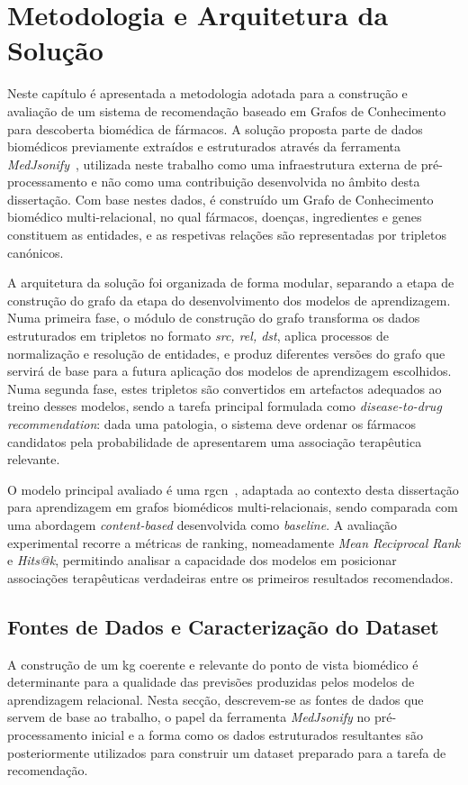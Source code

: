 % 
%  
%
\chapter{Metodologia e Arquitetura da Solução}
\label{cha:metodologia-arquitetura}
Neste capítulo é apresentada a metodologia adotada para a construção e avaliação de um sistema de recomendação baseado em Grafos de Conhecimento para descoberta biomédica de fármacos. A solução proposta parte de dados biomédicos previamente extraídos e estruturados através da ferramenta \emph{MedJsonify}~\cite{pereira2025mapping}, utilizada neste trabalho como uma infraestrutura externa de pré-processamento e não como uma contribuição desenvolvida no âmbito desta dissertação. Com base nestes dados, é construído um Grafo de Conhecimento biomédico multi-relacional, no qual fármacos, doenças, ingredientes e genes constituem as entidades, e as respetivas relações são representadas por tripletos canónicos.

A arquitetura da solução foi organizada de forma modular, separando a etapa de construção do grafo da etapa do desenvolvimento dos modelos de aprendizagem. Numa primeira fase, o módulo de construção do grafo transforma os dados estruturados em tripletos no formato \emph{src, rel, dst}, aplica processos de normalização e resolução de entidades, e produz diferentes versões do grafo que servirá de base para a futura aplicação dos modelos de aprendizagem escolhidos. Numa segunda fase, estes tripletos são convertidos em artefactos adequados ao treino desses modelos, sendo a tarefa principal formulada como \emph{disease-to-drug recommendation}: dada uma patologia, o sistema deve ordenar os fármacos candidatos pela probabilidade de apresentarem uma associação terapêutica relevante.

O modelo principal avaliado é uma \acrshort{rgcn}~\cite{schlichtkrull2018modeling}, adaptada ao contexto desta dissertação para aprendizagem em grafos biomédicos multi-relacionais, sendo comparada com uma abordagem \emph{content-based} desenvolvida como \emph{baseline}. A avaliação experimental recorre a métricas de ranking, nomeadamente \emph{Mean Reciprocal Rank} e \emph{Hits@k}, permitindo analisar a capacidade dos modelos em posicionar associações terapêuticas verdadeiras entre os primeiros resultados recomendados.

\section{Fontes de Dados e Caracterização do Dataset}
\label{sec:aquisicao-caracterizacao}
A construção de um \acrshort{kg} coerente e relevante do ponto de vista biomédico é determinante para a qualidade das previsões produzidas pelos modelos de aprendizagem relacional. Nesta secção, descrevem-se as fontes de dados que servem de base ao trabalho, o papel da ferramenta \emph{MedJsonify} no pré-processamento inicial e a forma como os dados estruturados resultantes são posteriormente utilizados para construir um dataset preparado para a tarefa de recomendação.

